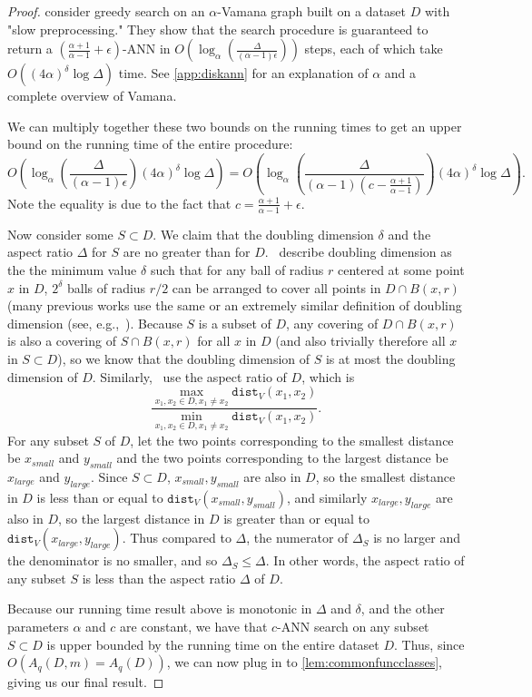 \documentclass{article}
\theoremstyle{plain}
\theoremstyle{definition}
\theoremstyle{remark}
\begin{document}
\existingannruntime*
\begin{proof}
\cite{indyk2023worst} consider greedy search on an $\alpha$-Vamana graph built on a dataset $D$ with "slow preprocessing." They show that the search procedure is guaranteed to return a $(\frac{\alpha + 1}{\alpha - 1} + \epsilon)$-ANN in $O(\log_\alpha(\frac{\Delta}{(\alpha - 1) \epsilon}))$ steps, each of which take $O((4\alpha)^\delta \log \Delta)$ time. See \cref{app:diskann} for an explanation of $\alpha$ and a complete overview of Vamana. 

We can multiply together these two bounds on the running times to get an upper bound on the running time of the entire procedure:
$$O\left(\log_\alpha\left(\frac{\Delta}{\left(\alpha - 1\right) \epsilon}\right)\left(4\alpha\right)^\delta \log \Delta\right) = O\left(\log_\alpha\left(\frac{\Delta}{\left(\alpha - 1\right) (c - \frac{\alpha + 1}{\alpha - 1})}\right)\left(4\alpha\right)^\delta \log \Delta\right).$$
Note the equality is due to the fact that $c = \frac{\alpha + 1}{\alpha - 1} + \epsilon$. 

Now consider some $S \subset D$. We claim that the doubling dimension $\delta$ and the aspect ratio $\Delta$ for $S$ are no greater than for $D$.~\cite{indyk2023worst} describe doubling dimension as the the minimum value $\delta$ such that for any ball of radius $r$ centered at some point $x$ in $D$, $2^\delta$ balls of radius $r / 2$ can be arranged to cover all points in $D \cap B(x, r)$ (many previous works use the same or an extremely similar definition of doubling dimension (see, e.g.,~\cite{clarkson1997nearest, krauthgamer2004navigating}). Because $S$ is a subset of $D$, any covering of $D \cap B(x, r)$ is also a covering of $S \cap B(x, r)$ for all $x$ in $D$ (and also trivially therefore all $x$ in $S \subset D$), so we know that the doubling dimension of $S$ is at most the doubling dimension of $D$. Similarly,~\cite{indyk2023worst} use the aspect ratio of $D$, which is
$$\frac{\max_{x_1, x_2 \in D, x_1 \ne x_2} \texttt{dist}_V(x_1, x_2)}{\min_{x_1, x_2 \in D, x_1 \ne x_2} \texttt{dist}_V(x_1, x_2)}.$$
For any subset $S$ of $D$, let the two points corresponding to the smallest distance be $x_{small}$ and $y_{small}$ and the two points corresponding to the largest distance be $x_{large}$ and $y_{large}$. Since $S \subset D$, $x_{small}, y_{small}$ are also in $D$, so the smallest distance in $D$ is less than or equal to $\texttt{dist}_V(x_{small}, y_{small})$, and similarly $x_{large}, y_{large}$ are also in $D$, so the largest distance in $D$ is greater than or equal to $\texttt{dist}_V(x_{large}, y_{large})$. Thus compared to $\Delta$, the numerator of $\Delta_S$ is no larger and the denominator is no smaller, and so $\Delta_S \le \Delta$. In other words, the aspect ratio of any subset $S$ is less than the aspect ratio $\Delta$ of $D$. 

Because our running time result above is monotonic in $\Delta$ and $\delta$, and the other parameters $\alpha$ and $c$ are constant, we have that $c$-ANN search on any subset $S \subset D$ is upper bounded by the running time on the entire dataset $D$. Thus, since $O(A_q(D, m) = A_q(D))$, we can now plug in to \cref{lem:commonfuncclasses}, giving us our final result.
\end{proof}
\end{document}
